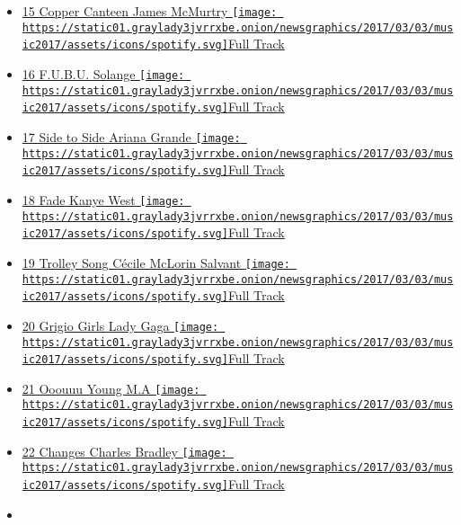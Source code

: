 \begin{itemize}
{  Track}
\item
  \protect\hyperlink{ux2fjames-mcmurtry-copper-canteen}{ 15 Copper
  Canteen James McMurtry }
  \href{https://open.spotify.com/track/2jG8qg7KDYWKm9smYCXz1i}{\texttt{[image: https://static01.graylady3jvrrxbe.onion/newsgraphics/2017/03/03/music2017/assets/icons/spotify.svg]}Full
  Track}
\item
  \protect\hyperlink{ux2fsolange-fubu}{ 16 F.U.B.U. Solange }
  \href{https://open.spotify.com/track/2aR6SYRJxy2QsBxA459ATF}{\texttt{[image: https://static01.graylady3jvrrxbe.onion/newsgraphics/2017/03/03/music2017/assets/icons/spotify.svg]}Full
  Track}
\item
  \protect\hyperlink{ux2fariana-grande-side-to-side}{ 17 Side to Side
  Ariana Grande }
  \href{https://open.spotify.com/track/1pKeFVVUOPjFsOABub0OaV}{\texttt{[image: https://static01.graylady3jvrrxbe.onion/newsgraphics/2017/03/03/music2017/assets/icons/spotify.svg]}Full
  Track}
\item
  \protect\hyperlink{ux2fkanye-west-fade}{ 18 Fade Kanye West }
  \href{https://open.spotify.com/track/3cCxoOgfi6hgt8MNteuiiD}{\texttt{[image: https://static01.graylady3jvrrxbe.onion/newsgraphics/2017/03/03/music2017/assets/icons/spotify.svg]}Full
  Track}
\item
  \protect\hyperlink{ux2fccile-mclorin-salvant-trolley-song}{ 19 Trolley
  Song Cécile McLorin Salvant }
  \href{https://open.spotify.com/track/5j78Obp9QYGopCUlsDd3nQ}{\texttt{[image: https://static01.graylady3jvrrxbe.onion/newsgraphics/2017/03/03/music2017/assets/icons/spotify.svg]}Full
  Track}
\item
  \protect\hyperlink{ux2flady-gaga-grigio-girls}{ 20 Grigio Girls Lady
  Gaga }
  \href{https://open.spotify.com/track/6Xxvdy1m9TX9HTxOzQcfuV}{\texttt{[image: https://static01.graylady3jvrrxbe.onion/newsgraphics/2017/03/03/music2017/assets/icons/spotify.svg]}Full
  Track}
\item
  \protect\hyperlink{ux2fyoung-ma-ooouuu}{ 21 Ooouuu Young M.A }
  \href{https://open.spotify.com/track/0D21XvHcVsIvJM6FcGY2BT}{\texttt{[image: https://static01.graylady3jvrrxbe.onion/newsgraphics/2017/03/03/music2017/assets/icons/spotify.svg]}Full
  Track}
\item
  \protect\hyperlink{ux2fcharles-bradley-changes}{ 22 Changes Charles
  Bradley }
  \href{https://open.spotify.com/track/3i85UIF4nR7qZXTnEwqdPr}{\texttt{[image: https://static01.graylady3jvrrxbe.onion/newsgraphics/2017/03/03/music2017/assets/icons/spotify.svg]}Full
  Track}
\item

\end{itemize}
